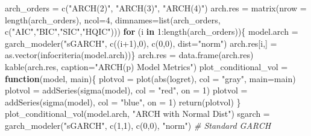 \documentclass[
  11pt,
]{article}
\newenvironment{Shaded}{\begin{snugshade}}{\end{snugshade}}
\newcommand{\AttributeTok}[1]{\textcolor[rgb]{0.77,0.63,0.00}{#1}}
\newcommand{\CommentTok}[1]{\textcolor[rgb]{0.56,0.35,0.01}{\textit{#1}}}
\newcommand{\ControlFlowTok}[1]{\textcolor[rgb]{0.13,0.29,0.53}{\textbf{#1}}}
\newcommand{\DecValTok}[1]{\textcolor[rgb]{0.00,0.00,0.81}{#1}}
\newcommand{\FunctionTok}[1]{\textcolor[rgb]{0.00,0.00,0.00}{#1}}
\newcommand{\NormalTok}[1]{#1}
\newcommand{\OtherTok}[1]{\textcolor[rgb]{0.56,0.35,0.01}{#1}}
\newcommand{\SpecialCharTok}[1]{\textcolor[rgb]{0.00,0.00,0.00}{#1}}
\newcommand{\StringTok}[1]{\textcolor[rgb]{0.31,0.60,0.02}{#1}}
\begin{document}
\begin{Shaded}
\begin{Highlighting}[]
\NormalTok{arch\_orders }\OtherTok{=} \FunctionTok{c}\NormalTok{(}\StringTok{"ARCH(2)"}\NormalTok{, }\StringTok{"ARCH(3)"}\NormalTok{, }\StringTok{"ARCH(4)"}\NormalTok{)}
\NormalTok{arch.res }\OtherTok{=} \FunctionTok{matrix}\NormalTok{(}\AttributeTok{nrow =} \FunctionTok{length}\NormalTok{(arch\_orders), }\AttributeTok{ncol=}\DecValTok{4}\NormalTok{, }
                  \AttributeTok{dimnames=}\FunctionTok{list}\NormalTok{(arch\_orders,  }\FunctionTok{c}\NormalTok{(}\StringTok{"AIC"}\NormalTok{,}\StringTok{"BIC"}\NormalTok{,}\StringTok{"SIC"}\NormalTok{,}\StringTok{"HQIC"}\NormalTok{)))}
\ControlFlowTok{for}\NormalTok{ (i }\ControlFlowTok{in} \DecValTok{1}\SpecialCharTok{:}\FunctionTok{length}\NormalTok{(arch\_orders))\{}
\NormalTok{  model.arch }\OtherTok{=} \FunctionTok{garch\_modeler}\NormalTok{(}\StringTok{"sGARCH"}\NormalTok{, }\FunctionTok{c}\NormalTok{((i}\SpecialCharTok{+}\DecValTok{1}\NormalTok{),}\DecValTok{0}\NormalTok{), }\FunctionTok{c}\NormalTok{(}\DecValTok{0}\NormalTok{,}\DecValTok{0}\NormalTok{), }\AttributeTok{dist=}\StringTok{"norm"}\NormalTok{)}
\NormalTok{  arch.res[i,] }\OtherTok{=} \FunctionTok{as.vector}\NormalTok{(}\FunctionTok{infocriteria}\NormalTok{(model.arch))\}}
\NormalTok{arch.res }\OtherTok{=} \FunctionTok{data.frame}\NormalTok{(arch.res)}
\FunctionTok{kable}\NormalTok{(arch.res, }\AttributeTok{caption=}\StringTok{"ARCH(p) Model Metrics"}\NormalTok{)}
\NormalTok{plot\_conditional\_vol }\OtherTok{=} \ControlFlowTok{function}\NormalTok{(model, main)\{}
\NormalTok{  plotvol }\OtherTok{=} \FunctionTok{plot}\NormalTok{(}\FunctionTok{abs}\NormalTok{(logret), }\AttributeTok{col =} \StringTok{"gray"}\NormalTok{, }\AttributeTok{main=}\NormalTok{main)}
\NormalTok{  plotvol }\OtherTok{=} \FunctionTok{addSeries}\NormalTok{(}\FunctionTok{sigma}\NormalTok{(model), }\AttributeTok{col =} \StringTok{"red"}\NormalTok{, }\AttributeTok{on =} \DecValTok{1}\NormalTok{)}
\NormalTok{  plotvol }\OtherTok{=} \FunctionTok{addSeries}\NormalTok{(}\FunctionTok{sigma}\NormalTok{(model), }\AttributeTok{col =} \StringTok{"blue"}\NormalTok{, }\AttributeTok{on =} \DecValTok{1}\NormalTok{)}
  \FunctionTok{return}\NormalTok{(plotvol) \}}
\FunctionTok{plot\_conditional\_vol}\NormalTok{(model.arch, }\StringTok{"ARCH with Normal Dist"}\NormalTok{)}
\NormalTok{sgarch }\OtherTok{=}  \FunctionTok{garch\_modeler}\NormalTok{(}\StringTok{"sGARCH"}\NormalTok{, }\FunctionTok{c}\NormalTok{(}\DecValTok{1}\NormalTok{,}\DecValTok{1}\NormalTok{), }\FunctionTok{c}\NormalTok{(}\DecValTok{0}\NormalTok{,}\DecValTok{0}\NormalTok{), }\StringTok{"norm"}\NormalTok{) }\CommentTok{\# Standard GARCH}

\end{Highlighting}
\end{Shaded}
\end{document}
